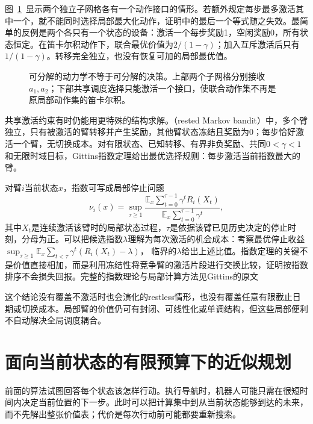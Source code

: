 图~\ref{fig:rl-planning-factorization}~显示两个独立子网格各有一个动作接口的情形。若额外规定每步最多激活其中一个，就不能同时选择局部最大化动作，证明中的最后一个等式随之失效。最简单的反例是两个各只有一个状态的设备：激活一个每步奖励1，空闲奖励0，所有状态恒定。在笛卡尔积动作下，联合最优价值为$2/(1-\gamma)$；加入互斥激活后只有$1/(1-\gamma)$。转移完全独立，也没有恢复可加的局部最优值。

\begin{figure}[htbp]
 \centering
 
 \caption{可分解的动力学不等于可分解的决策。上部两个子网格分别接收$a_1,a_2$；下部共享调度选择只能激活一个接口，使联合动作集不再是原局部动作集的笛卡尔积。}
 \label{fig:rl-planning-factorization}
\end{figure}

共享激活约束有时仍能用更特殊的结构求解。（rested Markov bandit）中，多个臂独立，只有被激活的臂转移并产生奖励，其他臂状态冻结且奖励为0；每步恰好激活一个臂，无切换成本。对有限状态、已知转移、有界非负奖励、共同$0<\gamma<1$和无限时域目标，Gittins指数定理给出最优选择规则：每步激活当前指数最大的臂。

对臂$i$当前状态$x$，指数可写成局部停止问题
\begin{equation}
 \nu_i(x)=\sup_{\tau\geq1}
 \frac{\mathbb E_x\sum_{t=0}^{\tau-1}\gamma^t R_i(X_t)}
      {\mathbb E_x\sum_{t=0}^{\tau-1}\gamma^t},
 \label{eq:rl-planning-gittins}
\end{equation}
其中$X_t$是连续激活该臂时的局部状态过程，$\tau$是依据该臂已见历史决定的停止时刻，分母为正。可以把候选指数$\lambda$理解为每次激活的机会成本：考察最优停止收益
$\sup_{\tau\geq1}\mathbb E_x\sum_{t<\tau}\gamma^t(R_i(X_t)-\lambda)$，
临界的$\lambda$给出上述比值。指数定理的关键不是价值直接相加，而是利用冻结性将竞争臂的激活片段进行交换比较，证明按指数排序不会损失回报。完整的指数理论与局部计算方法见Gittins的原文

这个结论没有覆盖不激活时也会演化的restless情形，也没有覆盖任意有限截止日期或切换成本。局部臂的价值仍可有封闭、可线性化或单调结构，但这些局部便利不自动解决全局调度耦合。

\section{面向当前状态的有限预算下的近似规划}
\label{sec:rl-planning-local-search}

前面的算法试图回答每个状态该怎样行动。执行导航时，机器人可能只需在很短时间内决定当前位置的下一步。此时可以把计算集中到从当前状态能够到达的未来，而不先解出整张价值表；代价是每次行动前可能都要重新搜索。

